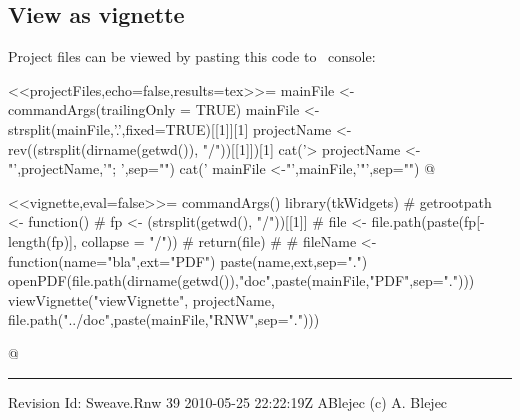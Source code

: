 \documentclass[a4paper,12pt]{article}
\newcommand{\SVNRevision}{$ $Rev: 39 $ $}
\newcommand{\SVNId}{$ $Id: Sweave.Rnw 39 2010-05-25 22:22:19Z ABlejec $ $}
\begin{document}
\subsection*{View as vignette}
Project files can be viewed by pasting this code to \R\ console:\\
\begin{Schunk}
\begin{Sinput}
<<projectFiles,echo=false,results=tex>>=
mainFile <- commandArgs(trailingOnly = TRUE)
mainFile <- strsplit(mainFile,'.',fixed=TRUE)[[1]][1]
projectName <- rev((strsplit(dirname(getwd()), "/"))[[1]])[1]
cat('> projectName <-"',projectName,'"; ',sep="")
cat(' mainFile <-"',mainFile,'"',sep="")
@

\end{Sinput}
\end{Schunk}
<<vignette,eval=false>>=
commandArgs()
library(tkWidgets)
# getrootpath <- function() {
# fp <- (strsplit(getwd(), "/"))[[1]]
# file <- file.path(paste(fp[-length(fp)], collapse = "/"))
# return(file)
# }
# fileName <- function(name="bla",ext="PDF") paste(name,ext,sep=".")
 openPDF(file.path(dirname(getwd()),"doc",paste(mainFile,"PDF",sep=".")))
 viewVignette("viewVignette", projectName, file.path("../doc",paste(mainFile,"RNW",sep=".")))

@

\vfill \hrule \vspace{2pt} \footnotesize{
Revision \SVNId\hfill (c) A. Blejec%
}
\end{document}

